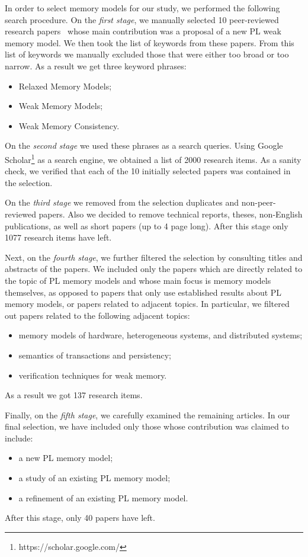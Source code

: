 In order to select memory models for our study, 
we performed the following search procedure.
On the \emph{first stage}, we manually selected 10  
peer-reviewed research papers~\cite{
Manson-al:POPL05,
Batty-al:POPL11,
Lahav-al:PLDI17,
Dolan-al:PLDI18,
Watt-al:PLDI2020,
Jeffrey-Riely:LICS16,
PichonPharabod-Sewell:POPL16,
Kang-al:POPL17,
Chakraborty-Vafeiadis:POPL19,
Paviotti-al:ESOP20
} 
whose main contribution was a proposal of a new PL weak memory model.
We then took the list of keywords from these papers. 
From this list of keywords we manually excluded those 
that were either too broad or too narrow.
As a result we get three keyword phrases:
\begin{itemize}
  \item Relaxed Memory Models;
  \item Weak Memory Models;
  \item Weak Memory Consistency.
\end{itemize}
 
On the \emph{second stage} we used these phrases as a search queries. 
Using Google Scholar\footnote{https://scholar.google.com/} as a search engine, 
we obtained a list of 2000 research items. 
As a sanity check, we verified that each of the 10 initially selected papers 
was contained in the selection. 

On the \emph{third stage} we removed from the selection duplicates and non-peer-reviewed papers. 
Also we decided to remove technical reports, theses, 
non-English publications, as well as short papers (up to 4 page long).
After this stage only 1077 research items have left.

Next, on the \emph{fourth stage}, we further filtered the selection 
by consulting titles and abstracts of the papers. 
We included only the papers which are directly related to the 
topic of PL memory models and whose main focus is memory models themselves,
as opposed to papers that only use established results about PL memory models,
or papers related to adjacent topics. 
In particular, we filtered out papers related to the following adjacent topics:
\begin{itemize}
  \item memory models of hardware, heterogeneous systems, and distributed systems;
  \item semantics of transactions and persistency;
  \item verification techniques for weak memory.
\end{itemize}
As a result we got 137 research items.

Finally, on the \emph{fifth stage}, we carefully examined the remaining articles.
In our final selection, we have included only those whose contribution was claimed to include:
\begin{itemize}
  \item a new PL memory model;
  \item a study of an existing PL memory model;
  \item a refinement of an existing PL memory model.
\end{itemize}
After this stage, only 40 papers have left.

